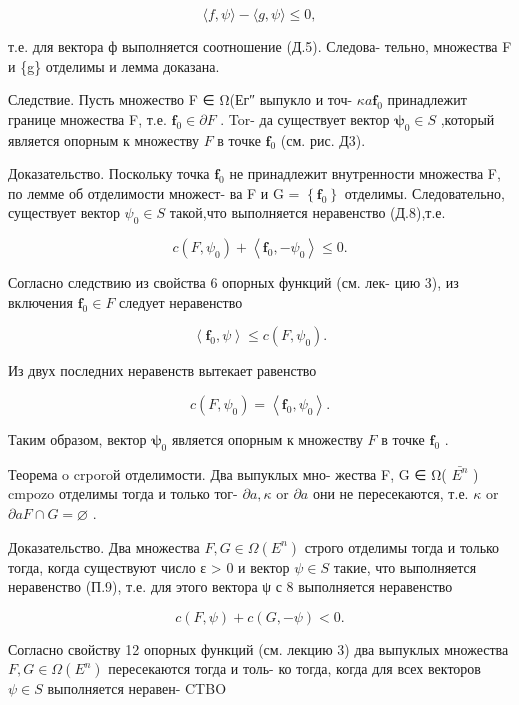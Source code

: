 \documentclass[8pt]{extarticle}
\begin{document}
\[
\langle f,\psi \rangle  - \langle g,\psi \rangle  \leq  0,
\]

т.е. для вектора ф выполняется соотношение (Д.5). Следова- тельно, множества F и \{g\} отделимы и лемма доказана.

Следствие. Пусть множество F ∈ Ω(Ег″ выпукло и точ- \({\kappa a}{\mathbf{f}}_{0}\) принадлежит границе множества F, т.е. \({\mathbf{f}}_{0} \in  \partial F\) . Tor- да существует вектор \({\mathbf{\psi }}_{0} \in  S\) ,который является опорным к множеству \(F\) в точке \({\mathbf{f}}_{0}\) (см. рис. Д3).

Доказательство. Поскольку точка \({\mathbf{f}}_{0}\) не принадлежит внутренности множества F, по лемме об отделимости множест- ва F и G = \(\left\{  {\mathbf{f}}_{0}\right\}\) отделимы. Следовательно, существует вектор \({\psi }_{0} \in  S\) такой,что выполняется неравенство (Д.8),т.е.

\[
c\left( {F,{\psi }_{0}}\right)  + \left\langle  {{\mathbf{f}}_{0}, - {\psi }_{0}}\right\rangle   \leq  0.
\]

Согласно следствию из свойства 6 опорных функций (см. лек- цию 3), из включения \({\mathbf{f}}_{0} \in  F\) следует неравенство

\[
\left\langle  {{\mathbf{f}}_{0},\psi }\right\rangle   \leq  c\left( {F,{\psi }_{0}}\right) .
\]

Из двух последних неравенств вытекает равенство

\[
c\left( {F,{\psi }_{0}}\right)  = \left\langle  {{\mathbf{f}}_{0},{\psi }_{0}}\right\rangle  .
\]

Таким образом, вектор \({\mathbf{\psi }}_{0}\) является опорным к множеству \(F\) в точке \({\mathbf{f}}_{0}\) .

Теорема o crporoй отделимости. Два выпуклых мно- жества F, G ∈ Ω( \(\bar{{E}^{n}}\) ) cmpozo отделимы тогда и только тог- \(\partial a,\kappa\) or \(\partial a\) они не пересекаются, т.е. \(\kappa\) or \(\partial aF \cap  G = \varnothing\) .

Доказательство. Два множества \(F,G \in  \Omega \left( {E}^{n}\right)\) строго отделимы тогда и только тогда, когда существуют число ε > 0 и вектор \(\psi  \in  S\) такие, что выполняется неравенство (П.9), т.е. для этого вектора ψ с 8 выполняется неравенство

\[
c\left( {F,\psi }\right)  + c\left( {G, - \psi }\right)  < 0.
\]

Согласно свойству 12 опорных функций (см. лекцию 3) два выпуклых множества \(F,G \in  \Omega \left( {E}^{n}\right)\) пересекаются тогда и толь- ко тогда, когда для всех векторов \(\psi  \in  S\) выполняется неравен- CTBO
\end{document}
